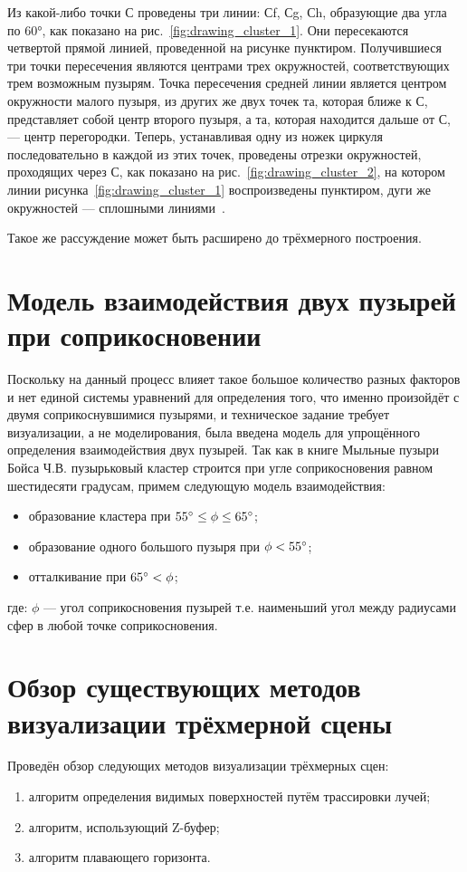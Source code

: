 Из какой-либо точки С проведены три линии: 
Сf, Сg, Сh, образующие два угла по 60°, как показано 
на рис.~\ref{fig:drawing_cluster_1}. Они пересекаются четвертой прямой линией, проведенной на рисунке пунктиром. Получившиеся три точки пересечения являются центрами трех окружностей, соответствующих трем возможным пузырям. 
Точка пересечения средней линии является центром 
окружности малого пузыря, из других же двух точек 
та, которая ближе к С, представляет собой центр второго пузыря, а та, которая находится дальше от С, — центр перегородки. Теперь, устанавливая одну из ножек циркуля последовательно в каждой из этих точек, проведены отрезки окружностей, проходящих через С, как показано на рис.~\ref{fig:drawing_cluster_2}, на котором линии рисунка~\ref{fig:drawing_cluster_1} воспроизведены пунктиром, дуги же окружностей — сплошными линиями~\cite{boys}.

Такое же рассуждение может быть расширено до трёхмерного построения.

\section{Модель взаимодействия двух пузырей при соприкосновении}
\label{sec:model_of_contact}
Поскольку на данный процесс влияет такое большое количество разных факторов и нет единой системы уравнений для определения того, что именно произойдёт с двумя соприкоснувшимися пузырями, и техническое задание требует визуализации, а не моделирования, была введена модель для упрощённого определения взаимодействия двух пузырей. Так как в книге \guillemotleft Мыльные пузыри\guillemotright~\cite{boys} Бойса Ч.В. пузырьковый кластер строится при угле соприкосновения равном шестидесяти градусам, примем следующую модель взаимодействия:
\begin{itemize}	
	\item образование кластера при $55\degree \leq \phi \leq 65\degree$;
	\item образование одного большого пузыря при $\phi < 55\degree$;
	\item отталкивание при $ 65\degree < \phi$;
\end{itemize}
где: $\phi$ --- угол соприкосновения пузырей т.е. наименьший угол между радиусами сфер в любой точке соприкосновения.
	
\section{Обзор существующих методов визуализации трёхмерной сцены}
Проведён обзор следующих методов визуализации трёхмерных сцен:
\begin{enumerate}[label={\arabic*)}]
	\item алгоритм определения видимых поверхностей путём трассировки лучей;
	\item алгоритм, использующий Z-буфер;
	\item алгоритм плавающего горизонта.
\end{enumerate}

